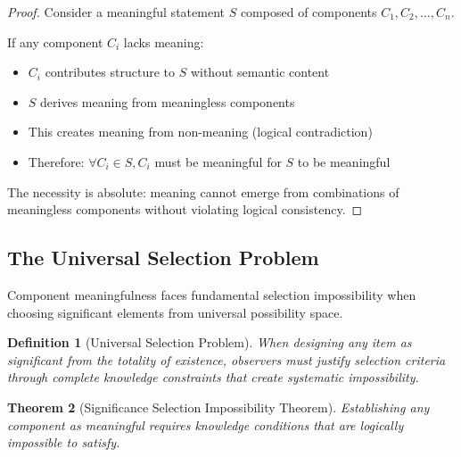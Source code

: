 \documentclass[12pt,a4paper]{article}
\newtheorem{theorem}{Theorem}[section]
\newtheorem{definition}[theorem]{Definition}
\begin{document}
\begin{proof}
Consider a meaningful statement $S$ composed of components $C_1, C_2, \ldots, C_n$.

If any component $C_i$ lacks meaning:
\begin{itemize}
\item $C_i$ contributes structure to $S$ without semantic content
\item $S$ derives meaning from meaningless components  
\item This creates meaning from non-meaning (logical contradiction)
\item Therefore: $\forall C_i \in S, C_i$ must be meaningful for $S$ to be meaningful
\end{itemize}

The necessity is absolute: meaning cannot emerge from combinations of meaningless components without violating logical consistency.
\end{proof}

\subsection{The Universal Selection Problem}

Component meaningfulness faces fundamental selection impossibility when choosing significant elements from universal possibility space.

\begin{definition}[Universal Selection Problem]
When designing any item as significant from the totality of existence, observers must justify selection criteria through complete knowledge constraints that create systematic impossibility.
\end{definition}

\begin{theorem}[Significance Selection Impossibility Theorem]
 Establishing any component as meaningful requires knowledge conditions that are logically impossible to satisfy.
\end{theorem}
\end{document}
